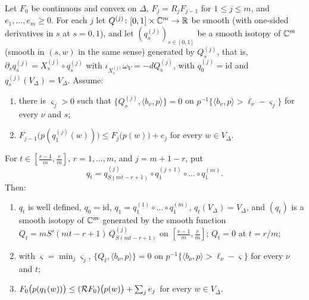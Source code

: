 \begin{lemma}\label{lem:fcp-composition}
Let $F_0$ be continuous and convex on $\Delta$, $F_j=R_jF_{j-1}$ for $1\le j\le m$, and $e_1,\dots,e_m\ge0$. For each
$j$ let $Q^{(j)}\colon[0,1]\times\mathbb{C}^m\to\mathbb{R}$ be smooth (with one-sided derivatives in $s$ at $s=0,1$), and let
$(q^{(j)}_s)_{s\in[0,1]}$ be a smooth isotopy of $\mathbb{C}^m$ (smooth in $(s,w)$ in the same sense) generated by $Q^{(j)}_s$,
that is, $\partial_sq^{(j)}_s=X^{(j)}_s\circ q^{(j)}_s$ with $\iota_{X^{(j)}_s}\omega_V=-dQ^{(j)}_s$, with
$q^{(j)}_0=\mathrm{id}$ and $q^{(j)}_s(V_\Delta)=V_\Delta$. Assume:
\begin{enumerate}[label=(\arabic*)]
\item there is $\varsigma_j>0$ such that
 $\{Q^{(j)}_s,\langle b_\nu,p\rangle\}=0$ on $p^{-1}\{\langle b_\nu,p\rangle>\ell_\nu-\varsigma_j\}$ for every $\nu$ and
 $s$;
\item $F_{j-1}\bigl(p(q^{(j)}_1(w))\bigr)\le F_j\bigl(p(w)\bigr)+e_j$ for every $w\in V_\Delta$.
\end{enumerate}
For $t\in[\frac{r-1}m,\frac rm]$, $r=1,\dots,m$, and $j=m+1-r$, put
\[
 q_t=q^{(j)}_{S(mt-r+1)}\circ q^{(j+1)}_1\circ\dots\circ q^{(m)}_1 .
\]
Then:
\begin{enumerate}[label=(\alph*)]
\item $q_t$ is well defined, $q_0=\mathrm{id}$, $q_1=q^{(1)}_1\circ\dots\circ q^{(m)}_1$, $q_t(V_\Delta)=V_\Delta$, and
 $(q_t)$ is a smooth isotopy of $\mathbb{C}^m$ generated by the smooth function $Q_t=mS'(mt-r+1)\,Q^{(j)}_{S(mt-r+1)}$ on
 $[\frac{r-1}m,\frac rm]$; $Q_t=0$ at $t=r/m$;
\item with $\varsigma=\min_j\varsigma_j$, $\{Q_t,\langle b_\nu,p\rangle\}=0$ on
 $p^{-1}\{\langle b_\nu,p\rangle>\ell_\nu-\varsigma\}$ for every $\nu$ and $t$;
\item $F_0\bigl(p(q_1(w))\bigr)\le(\mathcal{R} F_0)\bigl(p(w)\bigr)+\sum_je_j$ for every $w\in V_\Delta$.
\end{enumerate}
\end{lemma}

